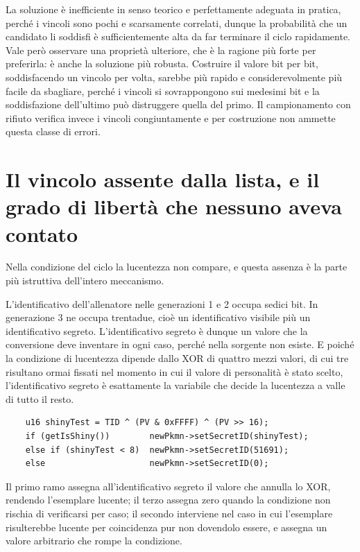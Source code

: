 La soluzione è inefficiente in senso teorico e perfettamente adeguata in pratica, perché i vincoli sono pochi e scarsamente correlati, dunque la probabilità che un candidato li soddisfi è sufficientemente alta da far terminare il ciclo rapidamente. Vale però osservare una proprietà ulteriore, che è la ragione più forte per preferirla: è anche la soluzione più robusta. Costruire il valore bit per bit, soddisfacendo un vincolo per volta, sarebbe più rapido e considerevolmente più facile da sbagliare, perché i vincoli si sovrappongono sui medesimi bit e la soddisfazione dell'ultimo può distruggere quella del primo. Il campionamento con rifiuto verifica invece i vincoli congiuntamente e per costruzione non ammette questa classe di errori.

\section{Il vincolo assente dalla lista, e il grado di libertà che nessuno aveva contato}

Nella condizione del ciclo la lucentezza non compare, e questa assenza è la parte più istruttiva dell'intero meccanismo.

L'identificativo dell'allenatore nelle generazioni 1 e 2 occupa sedici bit. In generazione 3 ne occupa trentadue, cioè un identificativo visibile più un identificativo segreto. L'identificativo segreto è dunque un valore che la conversione deve inventare in ogni caso, perché nella sorgente non esiste. E poiché la condizione di lucentezza dipende dallo XOR di quattro mezzi valori, di cui tre risultano ormai fissati nel momento in cui il valore di personalità è stato scelto, l'identificativo segreto è esattamente la variabile che decide la lucentezza a valle di tutto il resto.

\begin{verbatim}
    u16 shinyTest = TID ^ (PV & 0xFFFF) ^ (PV >> 16);
    if (getIsShiny())        newPkmn->setSecretID(shinyTest);
    else if (shinyTest < 8)  newPkmn->setSecretID(51691);
    else                     newPkmn->setSecretID(0);
\end{verbatim}

Il primo ramo assegna all'identificativo segreto il valore che annulla lo XOR, rendendo l'esemplare lucente; il terzo assegna zero quando la condizione non rischia di verificarsi per caso; il secondo interviene nel caso in cui l'esemplare risulterebbe lucente per coincidenza pur non dovendolo essere, e assegna un valore arbitrario che rompe la condizione.

